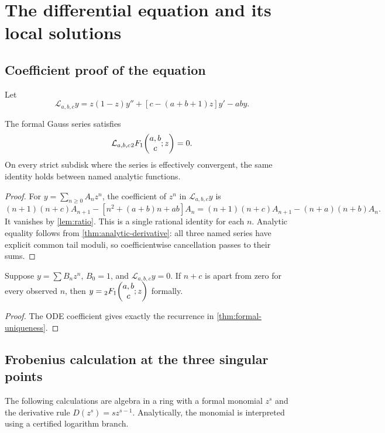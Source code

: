 \section{The differential equation and its local solutions}\label{sec:ode}

\subsection{Coefficient proof of the equation}

Let
\[
 \mathcal L_{a,b,c}y
 =z(1-z)y''+[c-(a+b+1)z]y'-aby.
\]

\begin{theorem}\label{thm:ode}
The formal Gauss series satisfies
\begin{equation}\label{eq:hg-ode}
 \mathcal L_{a,b,c}{}_2F_1\!\left(\begin{matrix}a,b\\c\end{matrix};z\right)=0.
\end{equation}
On every strict subdisk where the series is effectively convergent, the same
identity holds between named analytic functions.
\end{theorem}

\begin{proof}
For \(y=\sum_{n\ge0}A_nz^n\), the coefficient of \(z^n\) in
\(\mathcal L_{a,b,c}y\) is
\[
 (n+1)(n+c)A_{n+1}
 -[n^2+(a+b)n+ab]A_n
 =(n+1)(n+c)A_{n+1}-(n+a)(n+b)A_n.
\]
It vanishes by \cref{lem:ratio}.  This is a single rational identity for
each \(n\).  Analytic equality follows from
\cref{thm:analytic-derivative}: all three named series have explicit common
tail moduli, so coefficientwise cancellation passes to their sums.
\end{proof}

\begin{corollary}\label{cor:ode-unique}
Suppose \(y=\sum B_nz^n\), \(B_0=1\), and
\(\mathcal L_{a,b,c}y=0\).  If \(n+c\) is apart from zero for every observed
\(n\), then \(y={}_2F_1\!\left(\begin{matrix}a,b\\c\end{matrix};z\right)\) formally.
\end{corollary}

\begin{proof}
The ODE coefficient gives exactly the recurrence in
\cref{thm:formal-uniqueness}.
\end{proof}

\subsection{Frobenius calculation at the three singular points}

The following calculations are algebra in a ring with a formal monomial
\(z^s\) and the derivative rule
\(D(z^s)=sz^{s-1}\).  Analytically, the monomial is interpreted using a
certified logarithm branch.

